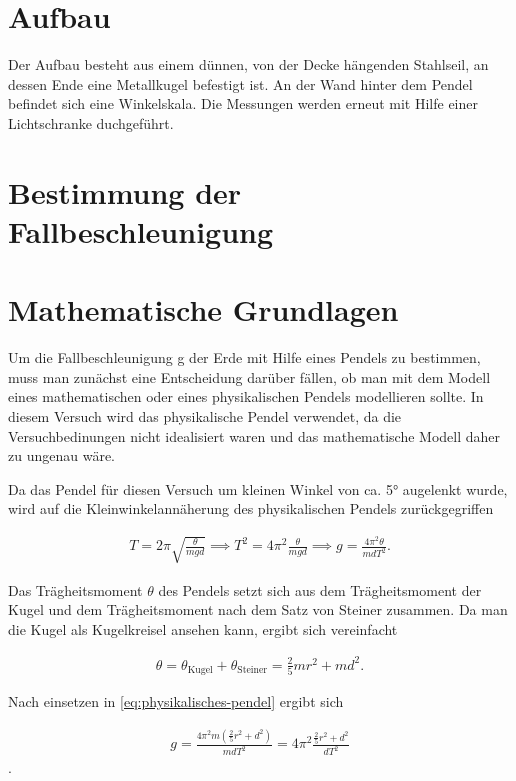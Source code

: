 \section{Aufbau}

Der Aufbau besteht aus einem dünnen, von der Decke hängenden Stahlseil, an dessen Ende eine Metallkugel befestigt ist. An der Wand hinter dem Pendel befindet sich eine Winkelskala. Die Messungen werden erneut mit Hilfe einer Lichtschranke duchgeführt.

\section{Bestimmung der Fallbeschleunigung}

\section{Mathematische Grundlagen}

Um die Fallbeschleunigung g der Erde mit Hilfe eines Pendels zu bestimmen, muss man zunächst eine Entscheidung darüber fällen, ob man mit dem Modell eines mathematischen oder eines physikalischen Pendels modellieren sollte.
In diesem Versuch wird das physikalische Pendel verwendet, da die Versuchbedinungen nicht idealisiert waren und das mathematische Modell daher zu ungenau wäre.

Da das Pendel für diesen Versuch um kleinen Winkel von ca. 5° augelenkt wurde, wird auf die Kleinwinkelannäherung des physikalischen Pendels zurückgegriffen

\begin{align}
	\label{eq:physikalisches-pendel}
	T = 2 \pi \sqrt{\frac{\theta}{m g d}}  \implies T^2 = 4 \pi^2 \frac{\theta}{m g d} \implies g = \frac{4 \pi^2 \theta}{m d T^2} .
\end{align}

Das Trägheitsmoment $\theta$ des Pendels setzt sich aus dem Trägheitsmoment der Kugel und dem Trägheitsmoment nach dem Satz von Steiner zusammen.
Da man die Kugel als Kugelkreisel ansehen kann, ergibt sich vereinfacht

\begin{align}
	\theta = \theta_\text{Kugel} + \theta_\text{Steiner} = \frac{2}{5} m r^2 + m d^2 .
\end{align}

Nach einsetzen in \ref{eq:physikalisches-pendel} ergibt sich

\begin{align}
	\label{eq:ortsfaktor}
	g = \frac{4 \pi^2 m (\frac{2}{5} r^2 + d^2)}{m d T^2} = 4 \pi^2 \frac{\frac{2}{5} r^2 + d^2}{d T^2}
\end{align} .

